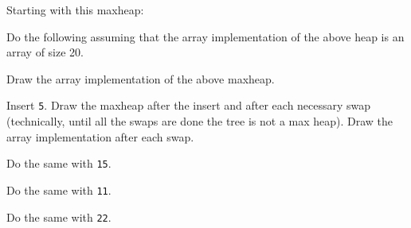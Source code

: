   Starting with this maxheap:




Do the following assuming that the array implementation
of the above heap is an array of size 20.
\begin{tightlist}
\item Draw the array implementation of the above maxheap.
\item Insert \texttt{5}. Draw the maxheap after the insert
and after each necessary swap (technically, until all the swaps are done
the tree is not a max heap). Draw the array implementation
after each swap.
\item Do the same with \texttt{15}.
\item Do the same with \texttt{11}.
\item Do the same with \texttt{22}.
\end{tightlist}
